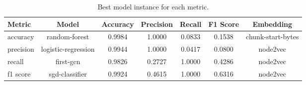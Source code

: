     \begin{table}
        \centering
        \caption{Best model instance for each metric.}
        \begin{tabular}{|l|c|c|c|c|c|c|} \hline 
          \textbf{Metric} & \textbf{Model}  & \textbf{Accuracy} & \textbf{Precision} & \textbf{Recall} & \textbf{F1 Score} & \textbf{Embedding}  \\ \hline 
            accuracy & random-forest & 0.9984 & 1.0000 & 0.0833 & 0.1538 & chunk-start-bytes \\ \hline 
            precision & logistic-regression & 0.9944 & 1.0000 & 0.0417 & 0.0800 & node2vec \\ \hline 
            recall & first-gcn & 0.9826 & 0.2727 & 1.0000 & 0.4286 & node2vec \\ \hline 
            f1 score & sgd-classifier & 0.9924 & 0.4615 & 1.0000 & 0.6316 & node2vec \\ \hline 
        \end{tabular}
    \end{table}
